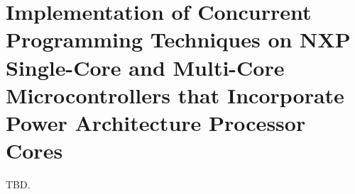 \section{Implementation of Concurrent Programming Techniques on
         NXP\textsuperscript{\textregistered} Single-Core and
         Multi-Core Microcontrollers that Incorporate
         Power Architecture\textsuperscript{\textregistered} Processor Cores}
\label{sicp0}

TBD.

